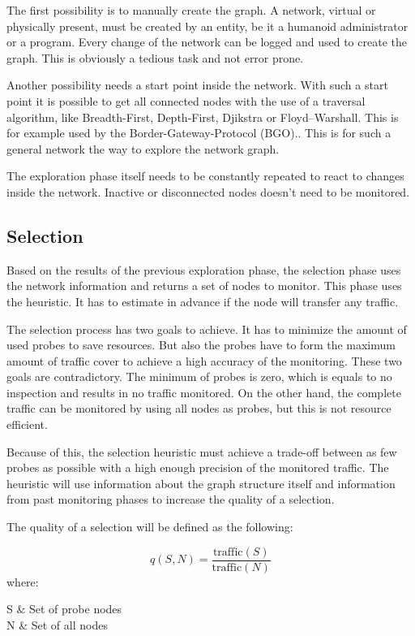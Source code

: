 \documentclass[thesis.tex]{subfiles}
\begin{document}
The first possibility is to manually create the graph. A network, virtual or physically present, must be created by an entity, be it a humanoid administrator or a program. Every change of the network can be logged and used to create the graph. This is obviously a tedious task and not error prone. 

Another possibility needs a start point inside the network. With such a start point it is possible to get all connected nodes with the use of a traversal algorithm, like Breadth-First, Depth-First, Djikstra or Floyd–Warshall. This is for example used by the Border-Gateway-Protocol (BGO).. This is for such a general network the way to explore the network graph.

The exploration phase itself needs to be constantly repeated to react to changes inside the network. Inactive or disconnected nodes doesn't need to be monitored.

\subsection{Selection} \label{sec:main:selectionPhase}

Based on the results of the previous exploration phase, the selection phase uses the network information and returns a set of nodes to monitor. This phase uses the heuristic. It has to estimate in advance if the node will transfer any traffic.

The selection process has two goals to achieve. It has to minimize the amount of used probes to save resources. But also the probes have to form the maximum amount of traffic cover to achieve a high accuracy of the monitoring. These two goals are contradictory. The minimum of probes is zero, which is equals to no inspection and results in no traffic monitored. On the other hand, the complete traffic can be monitored by using all nodes as probes, but this is not resource efficient.

Because of this, the selection heuristic must achieve a trade-off between as few probes as possible with a high enough precision of the monitored traffic. The heuristic will use information about the graph structure itself and information from past monitoring phases to increase the quality of a selection.

The quality of a selection will be defined as the following:

\begin{equation} \label{equo:qualitySelection}
q(S,N) = \frac{\text{traffic}(S)}{\text{traffic}(N)}
\end{equation}
where:
\begin{conditions}
    S     &  Set of probe nodes \\
    N     &  Set of all nodes
\end{conditions}
\end{document}
